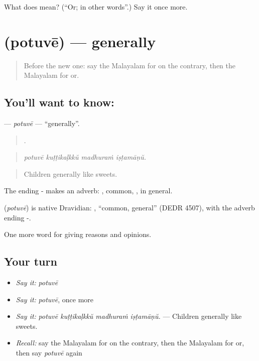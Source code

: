 \begin{tcolorbox}[breakable,colback=teal!4,colframe=teal!35!black,title={Before you move on}]
What does  mean? (\textquotedblleft{}Or; in other words\textquotedblright{}.) Say it once more.
\end{tcolorbox}
\section[\texorpdfstring{\ml{പൊതുവേ} (potuvē)}{പൊതുവേ (potuvē)}]{ (potuvē) — generally}

\label{lesson:ML-C412-potuve}



\begin{quote}
Before the new one: say the Malayalam for on the contrary, then the Malayalam for or.
\end{quote}

\subsection*{You'll want to know: }
\textbf{} — \emph{potuvē} — \textquotedblleft{}generally\textquotedblright{}.

\begin{quote}
   .
\end{quote}

\begin{quote}
\emph{potuvē kuṭṭikaḷkkŭ madhuraṁ iṣṭamāṇŭ.}
\end{quote}

\begin{quote}
Children generally like sweets.
\end{quote}

The ending - makes an adverb: , common, , in general.

\begin{cousinweb}
\textbf{} (\emph{potuvē}) is native Dravidian: , \textquotedblleft{}common, general\textquotedblright{} (DEDR 4507), with the adverb ending -.
\end{cousinweb}

\begin{grammarlens}[title={What you've built}]
One more word for giving reasons and opinions.
\end{grammarlens}

\subsection*{Your turn}
\begin{itemize}
\raggedright
  \item \emph{Say it:} \emph{potuvē}
  \item \emph{Say it:} \emph{potuvē}, once more
  \item \emph{Say it:} \emph{potuvē kuṭṭikaḷkkŭ madhuraṁ iṣṭamāṇŭ.} — Children generally like sweets.
  \item \emph{Recall:} say the Malayalam for on the contrary, then the Malayalam for or, then say \emph{potuvē} again
\end{itemize}

